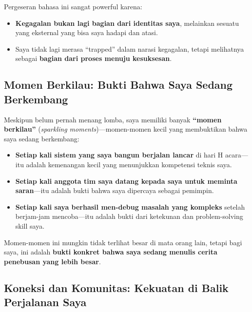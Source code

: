 \documentclass[
  letterpaper,
  DIV=11,
  numbers=noendperiod]{scrreprt}
\providecommand{\tightlist}{%
  \setlength{\itemsep}{0pt}\setlength{\parskip}{0pt}}
\begin{document}
Pergeseran bahasa ini sangat powerful karena:

\begin{itemize}
\tightlist
\item
  \textbf{Kegagalan bukan lagi bagian dari identitas saya}, melainkan
  sesuatu yang eksternal yang bisa saya hadapi dan atasi.
\item
  Saya tidak lagi merasa ``trapped'' dalam narasi kegagalan, tetapi
  melihatnya sebagai \textbf{bagian dari proses menuju kesuksesan}.
\end{itemize}

\subsection{\texorpdfstring{\textbf{Momen Berkilau: Bukti Bahwa Saya
Sedang
Berkembang}}{Momen Berkilau: Bukti Bahwa Saya Sedang Berkembang}}\label{momen-berkilau-bukti-bahwa-saya-sedang-berkembang}

Meskipun belum pernah menang lomba, saya memiliki banyak \textbf{``momen
berkilau''} (\emph{sparkling moments})---momen-momen kecil yang
membuktikan bahwa saya sedang berkembang:

\begin{itemize}
\item
  \textbf{Setiap kali sistem yang saya bangun berjalan lancar} di hari H
  acara---itu adalah kemenangan kecil yang menunjukkan kompetensi teknis
  saya.
\item
  \textbf{Setiap kali anggota tim saya datang kepada saya untuk meminta
  saran}---itu adalah bukti bahwa saya dipercaya sebagai pemimpin.
\item
  \textbf{Setiap kali saya berhasil men-debug masalah yang kompleks}
  setelah berjam-jam mencoba---itu adalah bukti dari ketekunan dan
  problem-solving skill saya.
\end{itemize}

Momen-momen ini mungkin tidak terlihat besar di mata orang lain, tetapi
bagi saya, ini adalah \textbf{bukti konkret bahwa saya sedang menulis
cerita penebusan yang lebih besar}.

\subsection{\texorpdfstring{\textbf{Koneksi dan Komunitas: Kekuatan di
Balik Perjalanan
Saya}}{Koneksi dan Komunitas: Kekuatan di Balik Perjalanan Saya}}\label{koneksi-dan-komunitas-kekuatan-di-balik-perjalanan-saya}
\end{document}
